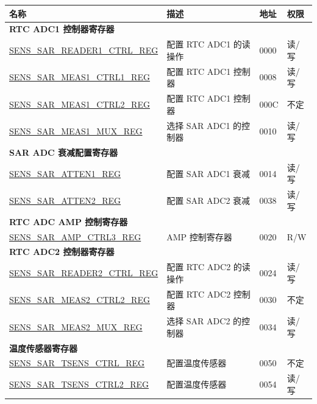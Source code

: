 \begin{longtable}{ | p{6cm} | p{7.2cm} | p{1.3cm} | p{1cm} | }
\hline\rowcolor{lightgray}
名称 & 描述 &  地址 & 权限 \\ \hline
\endhead
\multicolumn{4}{|l|}{\textbf{RTC ADC1 控制器寄存器}} \\ \hline
\hyperref[regdesc:SENSSARREADER1CTRLREG]{SENS\_SAR\_READER1\_CTRL\_REG} & 配置 RTC ADC1 的读操作 & \hexprefix{}0000 & 读/写 \\ \hline
\hyperref[regdesc:SENSSARMEAS1CTRL1REG]{SENS\_SAR\_MEAS1\_CTRL1\_REG} & 配置 RTC ADC1 控制器 & \hexprefix{}0008 & 读/写 \\ \hline
\hyperref[regdesc:SENSSARMEAS1CTRL2REG]{SENS\_SAR\_MEAS1\_CTRL2\_REG} & 配置 RTC ADC1 控制器 & \hexprefix{}000C & 不定 \\ \hline
\hyperref[regdesc:SENSSARMEAS1MUXREG]{SENS\_SAR\_MEAS1\_MUX\_REG} & 选择 SAR ADC1 的控制器 & \hexprefix{}0010 & 读/写 \\ \hline
\multicolumn{4}{|l|}{\textbf{SAR ADC 衰减配置寄存器}} \\ \hline
\hyperref[regdesc:SENSSARATTEN1REG]{SENS\_SAR\_ATTEN1\_REG} & 配置 SAR ADC1 衰减 & \hexprefix{}0014 & 读/写 \\ \hline
\hyperref[regdesc:SENSSARATTEN2REG]{SENS\_SAR\_ATTEN2\_REG} & 配置 SAR ADC2 衰减 & \hexprefix{}0038 & 读/写 \\ \hline
\multicolumn{4}{|l|}{\textbf{RTC ADC AMP 控制寄存器}} \\ \hline
\hyperref[regdesc:SENSSARAMPCTRL3REG]{SENS\_SAR\_AMP\_CTRL3\_REG} & AMP 控制寄存器 & \hexprefix{}0020 & R/W \\ \hline
\multicolumn{4}{|l|}{\textbf{RTC ADC2 控制器寄存器}} \\ \hline
\hyperref[regdesc:SENSSARREADER2CTRLREG]{SENS\_SAR\_READER2\_CTRL\_REG} & 配置 RTC ADC2 的读操作 & \hexprefix{}0024 & 读/写 \\ \hline
\hyperref[regdesc:SENSSARMEAS2CTRL2REG]{SENS\_SAR\_MEAS2\_CTRL2\_REG} & 配置 RTC ADC2 控制器 & \hexprefix{}0030 & 不定 \\ \hline
\hyperref[regdesc:SENSSARMEAS2MUXREG]{SENS\_SAR\_MEAS2\_MUX\_REG} & 选择 SAR ADC2 的控制器 & \hexprefix{}0034 & 读/写 \\ \hline
\multicolumn{4}{|l|}{\textbf{温度传感器寄存器}} \\ \hline
\hyperref[regdesc:SENSSARTSENSCTRLREG]{SENS\_SAR\_TSENS\_CTRL\_REG} & 配置温度传感器 & \hexprefix{}0050 & 不定 \\ \hline
\hyperref[regdesc:SENSSARTSENSCTRL2REG]{SENS\_SAR\_TSENS\_CTRL2\_REG} & 配置温度传感器 & \hexprefix{}0054 & 读/写 \\ \hline

\end{longtable}
